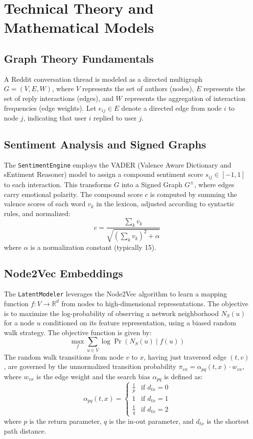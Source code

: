 \documentclass[12pt,a4paper]{report}
\begin{document}
\chapter{Technical Theory and Mathematical Models}
\section{Graph Theory Fundamentals}
A Reddit conversation thread is modeled as a directed multigraph $G = (V, E, W)$, where $V$ represents the set of authors (nodes), $E$ represents the set of reply interactions (edges), and $W$ represents the aggregation of interaction frequencies (edge weights). Let $e_{ij} \in E$ denote a directed edge from node $i$ to node $j$, indicating that user $i$ replied to user $j$.

\section{Sentiment Analysis and Signed Graphs}
The \texttt{SentimentEngine} employs the VADER (Valence Aware Dictionary and sEntiment Reasoner) model to assign a compound sentiment score $s_{ij} \in [-1, 1]$ to each interaction. This transforms $G$ into a Signed Graph $G^{\pm}$, where edges carry emotional polarity. The compound score $c$ is computed by summing the valence scores of each word $v_k$ in the lexicon, adjusted according to syntactic rules, and normalized:
\begin{equation}
    c = \frac{\sum_{k} v_k}{\sqrt{(\sum_{k} v_k)^2 + \alpha}}
\end{equation}
where $\alpha$ is a normalization constant (typically 15).

\section{Node2Vec Embeddings}
The \texttt{LatentModeler} leverages the Node2Vec algorithm to learn a mapping function $f: V \rightarrow \mathbb{R}^d$ from nodes to high-dimensional representations. The objective is to maximize the log-probability of observing a network neighborhood $N_S(u)$ for a node $u$ conditioned on its feature representation, using a biased random walk strategy. The objective function is given by:
\begin{equation}
    \max_{f} \sum_{u \in V} \log \Pr(N_S(u) \mid f(u))
\end{equation}
The random walk transitions from node $v$ to $x$, having just traversed edge $(t, v)$, are governed by the unnormalized transition probability $\pi_{vx} = \alpha_{pq}(t, x) \cdot w_{vx}$, where $w_{vx}$ is the edge weight and the search bias $\alpha_{pq}$ is defined as:
\begin{equation}
    \alpha_{pq}(t, x) = 
    \begin{cases}
    \frac{1}{p} & \text{if } d_{tx} = 0 \\
    1 & \text{if } d_{tx} = 1 \\
    \frac{1}{q} & \text{if } d_{tx} = 2
    \end{cases}
\end{equation}
where $p$ is the return parameter, $q$ is the in-out parameter, and $d_{tx}$ is the shortest path distance.
\end{document}
